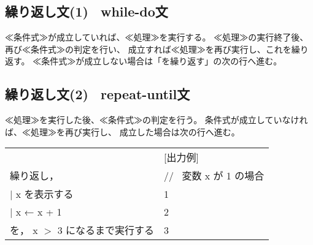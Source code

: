 \documentclass[11pt,a4j]{jarticle}
\begin{document}
\subsection{繰り返し文(1) \ while-do文}
\begin{quotation}
\end{quotation}

≪条件式≫が成立していれば、≪処理≫を実行する。 
≪処理≫の実行終了後、再び≪条件式≫の判定を行い、
成立すれば≪処理≫を再び実行し、これを繰り返す。 
≪条件式≫が成立しない場合は「を繰り返す」の次の行へ進む。

\vspace{-3mm}
\subsection{繰り返し文(2) \ repeat-until文}
\begin{quotation}
\end{quotation}
≪処理≫を実行した後、≪条件式≫の判定を行う。
条件式が成立していなければ、≪処理≫を再び実行し、
成立した場合は次の行へ進む。

\begin{table}[!h]
\hspace{1cm}
\begin{tabular}{l l}
\noindent [使用例] & \hspace{1cm} [出力例] \\
\hspace{1cm} \noindent 繰り返し，&
\hspace{2cm} // \ 変数 x が 1 の場合 \\
\hspace{1cm}   \hspace{1zw} $|$ \hspace{1zw}  x を表示する &
\hspace{2cm} 1 \\
\hspace{1cm}   \hspace{1zw} $|$ \hspace{1zw}  x ← x + 1 &
\hspace{2cm} 2 \\
\hspace{1cm} を， x $>$ 3 になるまで実行する &
\hspace{2cm} 3 \\
\end{tabular}
\end{table}
\end{document}
